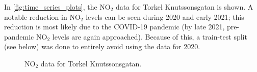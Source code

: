 In \vref{fig:time_series_plots}, the NO$_2$ data for Torkel Knutssonsgatan is shown. A notable reduction in NO$_2$ levels can be seen during 2020 and early 2021; this reduction is most likely due to the COVID-19 pandemic (by late 2021, pre-pandemic NO$_2$ levels are again approached).  Because of this, a train-test split (see below) was done to entirely avoid using the data for 2020.


\begin{figure}[h]
\centering
{}
\caption{NO$_2$ data for Torkel Knutssonsgatan.}
\label{fig:time_series_plots}
\end{figure}



